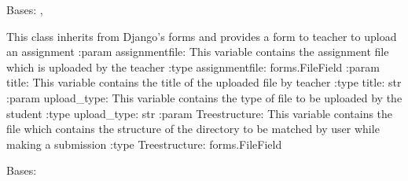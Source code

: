 \documentclass[letterpaper,10pt,english]{sphinxmanual}
\begin{document}

\begin{fulllineitems}
\label{\detokenize{users:users.forms.assignment_form}}
\sphinxAtStartPar
Bases: , 

\sphinxAtStartPar
This class inherits from Django’s forms and provides a form to teacher to upload an assignment
:param assignmentfile: This variable contains the assignment file which is  uploaded by the teacher
:type assignmentfile: forms.FileField
:param title: This variable contains the title of the uploaded file by teacher
:type title: str
:param upload\_type: This variable contains the type of file to be uploaded by the student
:type upload\_type: str
:param Treestructure: This variable contains the file which contains the structure of the directory to be matched by user while making a submission
:type Treestructure: forms.FileField

\begin{fulllineitems}
\label{\detokenize{users:users.forms.assignment_form.Meta}}
\sphinxAtStartPar
Bases: 

\begin{fulllineitems}
\label{\detokenize{users:users.forms.assignment_form.Meta.fields}}
\end{fulllineitems}


\end{fulllineitems}
\end{fulllineitems}
\end{document}
